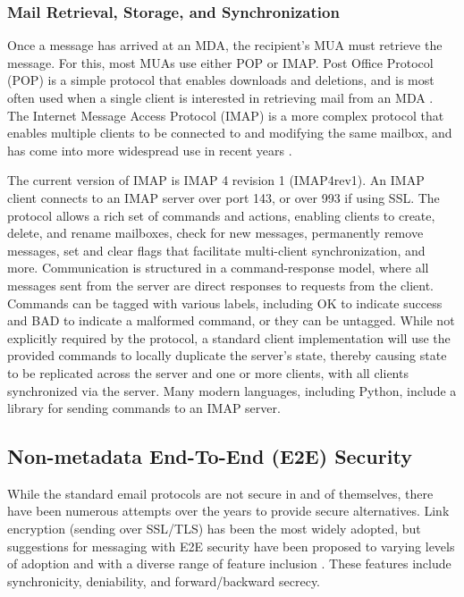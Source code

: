 \documentclass[pageno]{jpaper}
\begin{document}
\subsubsection{Mail Retrieval, Storage, and Synchronization}
\label{legacyimap}
Once a message has arrived at an MDA, the recipient's MUA must retrieve the message. For this, most MUAs use either POP or IMAP. Post Office Protocol (POP) is a simple protocol that enables downloads and deletions, and is most often used when a single client is interested in retrieving mail from an MDA \cite{reynolds1984post} \cite{myers1996post}. The Internet Message Access Protocol (IMAP) is a more complex protocol that enables multiple clients to be connected to and modifying the same mailbox, and has come into more widespread use in recent years \cite{rfc3501}.

The current version of IMAP is IMAP 4 revision 1 (IMAP4rev1). An IMAP client connects to an IMAP server over port 143, or over 993 if using SSL. The protocol allows a rich set of commands and actions, enabling clients to create, delete, and rename mailboxes, check for new messages, permanently remove messages, set and clear flags that facilitate multi-client synchronization, and more. Communication is structured in a command-response model, where all messages sent from the server are direct responses to requests from the client. Commands can be tagged with various labels, including OK to indicate success and BAD to indicate a malformed command, or they can be untagged. While not explicitly required by the protocol, a standard client implementation will use the provided commands to locally duplicate the server's state, thereby causing state to be replicated across the server and one or more clients, with all clients synchronized via the server. Many modern languages, including Python, include a library for sending commands to an IMAP server.

\subsection{Non-metadata End-To-End (E2E) Security}
While the standard email protocols are not secure in and of themselves, there have been numerous attempts over the years to provide secure alternatives. Link encryption (sending over SSL/TLS) has been the most widely adopted, but suggestions for messaging with E2E security have been proposed to varying levels of adoption and with a diverse range of feature inclusion \cite{unger2015sok}. These features include synchronicity, deniability, and forward/backward secrecy.
\end{document}
